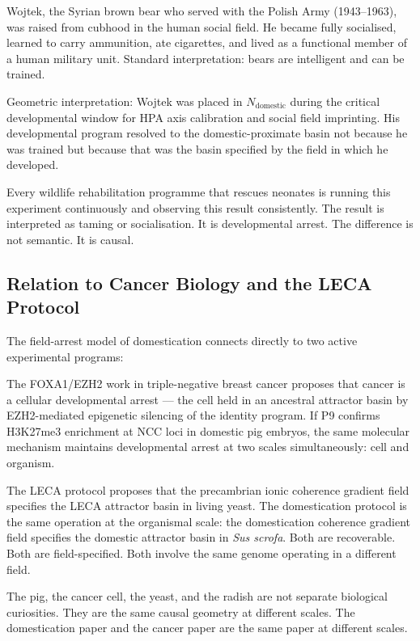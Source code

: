 \documentclass[11pt, a4paper]{article}
\begin{document}
Wojtek, the Syrian brown bear who served with the
Polish Army (1943--1963), was raised from cubhood
in the human social field. He became fully
socialised, learned to carry ammunition, ate
cigarettes, and lived as a functional member of
a human military unit. Standard interpretation:
bears are intelligent and can be trained.

Geometric interpretation: Wojtek was placed in
$N_{\text{domestic}}$ during the critical developmental
window for HPA axis calibration and social field
imprinting. His developmental program resolved to
the domestic-proximate basin not because he was
trained but because that was the basin specified
by the field in which he developed.

Every wildlife rehabilitation programme that
rescues neonates is running this experiment
continuously and observing this result consistently.
The result is interpreted as taming or socialisation.
It is developmental arrest. The difference is
not semantic. It is causal.

\subsection{Relation to Cancer Biology and
the LECA Protocol}

The field-arrest model of domestication connects
directly to two active experimental programs:

The FOXA1/EZH2 work in triple-negative breast
cancer proposes that cancer is a cellular
developmental arrest --- the cell held in an
ancestral attractor basin by EZH2-mediated
epigenetic silencing of the identity program.
If P9 confirms H3K27me3 enrichment at NCC loci
in domestic pig embryos, the same molecular
mechanism maintains developmental arrest at two
scales simultaneously: cell and organism.

The LECA protocol proposes that the precambrian
ionic coherence gradient field specifies the LECA
attractor basin in living yeast. The domestication
protocol is the same operation at the organismal
scale: the domestication coherence gradient field
specifies the domestic attractor basin in
\textit{Sus scrofa}. Both are recoverable.
Both are field-specified. Both involve the same
genome operating in a different field.

The pig, the cancer cell, the yeast, and the
radish are not separate biological curiosities.
They are the same causal geometry at different
scales. The domestication paper and the cancer
paper are the same paper at different scales.
\end{document}
